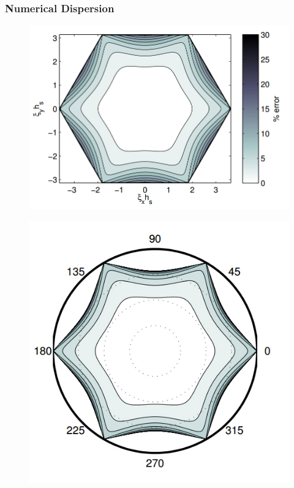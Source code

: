 \documentclass{beamer}
\begin{document}
\begin{frame}
\frametitle{Numerical Dispersion}

\begin{figure}
\centering
\begin{minipage}{.5\textwidth}
  \centering
\includegraphics[scale=0.2]{./images/jpgVelocity.jpg}
\label{fig:NumericalDispersion}
\end{minipage}%
\begin{minipage}{.5\textwidth}
  \centering
\includegraphics[scale=0.25]{./images/jpgVelocityPolar.jpg}
\label{fig:NumericalDispersionPolar}
\end{minipage}
\end{figure}



\end{frame}
\end{document}
